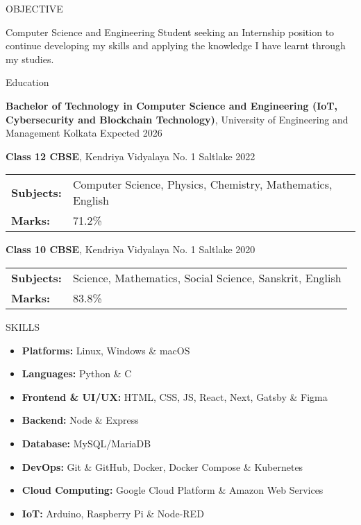\documentclass{resume}
\begin{document}
\vspace{0.8em}
\begin{rSection}{OBJECTIVE}

{Computer Science and Engineering Student seeking an Internship position to continue developing my skills and applying the knowledge I have learnt through my studies.}

\end{rSection}
\vspace{0.8em}
\begin{rSection}{Education}

{\bf Bachelor of Technology in Computer Science and Engineering (IoT, Cybersecurity and Blockchain Technology)}, University of Engineering and Management Kolkata \hfill {Expected 2026}\\
\vspace{1em}

{\bf Class 12 CBSE}, Kendriya Vidyalaya No. 1 Saltlake \hfill {2022}\\
\begin{tabular}{>{\bfseries}l l}
Subjects: & Computer Science, Physics, Chemistry, Mathematics, English \\
Marks: & 71.2\%
\end{tabular}

{\bf Class 10 CBSE}, Kendriya Vidyalaya No. 1 Saltlake \hfill {2020}
\begin{tabular}{>{\bfseries}l l}
Subjects: & Science, Mathematics, Social Science, Sanskrit, English \\
Marks: & 83.8\%
\end{tabular}


\end{rSection}
\vspace{0.8em}
\begin{rSection}{SKILLS}

\begin{itemize}
    \item \textbf{Platforms:} Linux, Windows \& macOS
    \item \textbf{Languages:} Python \& C
    \item \textbf{Frontend \& UI/UX: } HTML, CSS, JS, React, Next, Gatsby \& Figma
    \item \textbf{Backend: } Node \& Express
    \item \textbf{Database: } MySQL/MariaDB
    \item \textbf{DevOps:} Git \& GitHub, Docker, Docker Compose \& Kubernetes
    \item \textbf{Cloud Computing:} Google Cloud Platform \& Amazon Web Services
    \item \textbf{IoT:} Arduino, Raspberry Pi \& Node-RED
\end{itemize}
\end{rSection}
\end{document}
